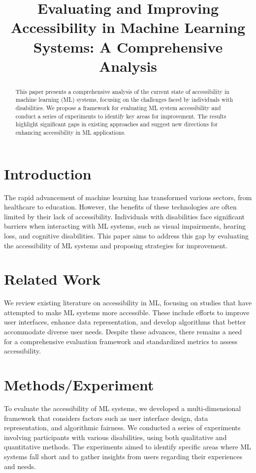\documentclass{article}
\title{Evaluating and Improving Accessibility in Machine Learning Systems: A Comprehensive Analysis}
\author{}
\date{}
\begin{document}
\maketitle

\begin{abstract}
This paper presents a comprehensive analysis of the current state of accessibility in machine learning (ML) systems, focusing on the challenges faced by individuals with disabilities. We propose a framework for evaluating ML system accessibility and conduct a series of experiments to identify key areas for improvement. The results highlight significant gaps in existing approaches and suggest new directions for enhancing accessibility in ML applications.
\end{abstract}

\section{Introduction}
The rapid advancement of machine learning has transformed various sectors, from healthcare to education. However, the benefits of these technologies are often limited by their lack of accessibility. Individuals with disabilities face significant barriers when interacting with ML systems, such as visual impairments, hearing loss, and cognitive disabilities. This paper aims to address this gap by evaluating the accessibility of ML systems and proposing strategies for improvement.

\section{Related Work}
We review existing literature on accessibility in ML, focusing on studies that have attempted to make ML systems more accessible. These include efforts to improve user interfaces, enhance data representation, and develop algorithms that better accommodate diverse user needs. Despite these advances, there remains a need for a comprehensive evaluation framework and standardized metrics to assess accessibility.

\section{Methods/Experiment}
To evaluate the accessibility of ML systems, we developed a multi-dimensional framework that considers factors such as user interface design, data representation, and algorithmic fairness. We conducted a series of experiments involving participants with various disabilities, using both qualitative and quantitative methods. The experiments aimed to identify specific areas where ML systems fall short and to gather insights from users regarding their experiences and needs.
\end{document}
